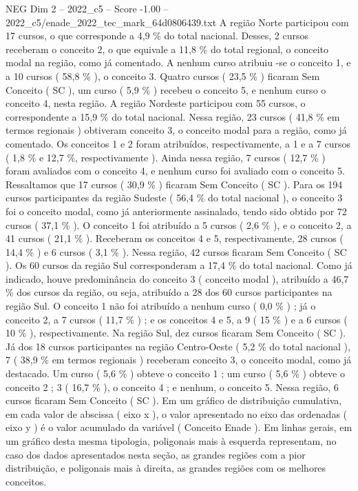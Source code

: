 \begin{textsample}{NEG Dim 2 – 2022\_c5 – Score -1.00 – 2022\_c5/enade\_2022\_tec\_mark\_64d0806439.txt}
A região Norte participou com 17 cursos, o que corresponde a 4,9 \% do total nacional.
Desses, 2 cursos receberam o conceito 2, o que equivale a 11,8 \% do total regional, o conceito modal na região, como já comentado.
A nenhum curso atribuiu -se o conceito 1, e a 10 cursos ( 58,8 \% ), o conceito 3.
Quatro cursos ( 23,5 \% ) ficaram Sem Conceito ( SC ), um curso ( 5,9 \% ) recebeu o conceito 5, e nenhum curso o conceito 4, nesta região.
A região Nordeste participou com 55 cursos, o correspondente a 15,9 \% do total nacional.
Nessa região, 23 cursos ( 41,8 \% em termos regionais ) obtiveram conceito 3, o conceito modal para a região, como já comentado.
Os conceitos 1 e 2 foram atribuídos, respectivamente, a 1 e a 7 cursos ( 1,8 \% e 12,7 \%, respectivamente ).
Ainda nessa região, 7 cursos ( 12,7 \% ) foram avaliados com o conceito 4, e nenhum curso foi avaliado com o conceito 5.
Ressaltamos que 17 cursos ( 30,9 \% ) ficaram Sem Conceito ( SC ).
Para os 194 cursos participantes da região Sudeste ( 56,4 \% do total nacional ), o conceito 3 foi o conceito modal, como já anteriormente assinalado, tendo sido obtido por 72 cursos ( 37,1 \% ).
O conceito 1 foi atribuído a 5 cursos ( 2,6 \% ), e o conceito 2, a 41 cursos ( 21,1 \% ).
Receberam os conceitos 4 e 5, respectivamente, 28 cursos ( 14,4 \% ) e 6 cursos ( 3,1 \% ).
Nessa região, 42 cursos ficaram Sem Conceito ( SC ).
Os 60 cursos da região Sul corresponderam a 17,4 \% do total nacional.
Como já indicado, houve predominância do conceito 3 ( conceito modal ), atribuído a 46,7 \% dos cursos da região, ou seja, atribuído a 28 dos 60 cursos participantes na região Sul.
O conceito 1 não foi atribuído a nenhum curso ( 0,0 \% ) ; já o conceito 2, a 7 cursos ( 11,7 \% ) ; e os conceitos 4 e 5, a 9 ( 15 \% ) e a 6 cursos ( 10 \% ), respectivamente.
Na região Sul, dez cursos ficaram Sem Conceito ( SC ).
Já dos 18 cursos participantes na região Centro-Oeste ( 5,2 \% do total nacional ), 7 ( 38,9 \% em termos regionais ) receberam conceito 3, o conceito modal, como já destacado.
Um curso ( 5,6 \% ) obteve o conceito 1 ; um curso ( 5,6 \% ) obteve o conceito 2 ; 3 ( 16,7 \% ), o conceito 4 ; e nenhum, o conceito 5.
Nessa região, 6 cursos ficaram Sem Conceito ( SC ).
Em um gráfico de distribuição cumulativa, em cada valor de abscissa ( eixo x ), o valor apresentado no eixo das ordenadas ( eixo y ) é o valor acumulado da variável ( Conceito Enade ).
Em linhas gerais, em um gráfico desta mesma tipologia, poligonais mais à esquerda representam, no caso dos dados apresentados nesta seção, as grandes regiões com a pior distribuição, e poligonais mais à direita, as grandes regiões com os melhores conceitos.

\end{textsample}
